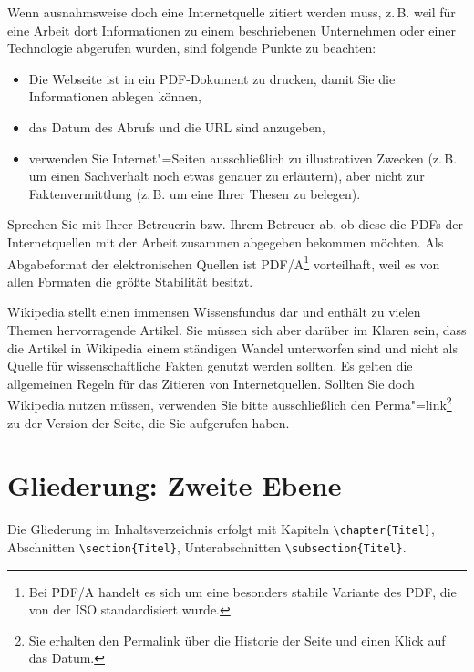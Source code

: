 Wenn ausnahmsweise doch eine Internetquelle zitiert werden muss, z.\,B. weil für eine Arbeit dort Informationen zu einem beschriebenen Unternehmen oder einer Technologie abgerufen wurden, sind folgende Punkte zu beachten:

\begin{itemize}
\item Die Webseite ist in ein PDF-Dokument zu drucken, damit Sie die Informationen ablegen können,
\item das Datum des Abrufs und die URL sind anzugeben,
\item verwenden Sie Internet"=Seiten ausschließlich zu illustrativen Zwecken (z.\,B. um einen Sachverhalt noch etwas genauer zu erläutern), aber nicht zur Faktenvermittlung (z.\,B. um eine Ihrer Thesen zu belegen).
\end{itemize}

Sprechen Sie mit Ihrer Betreuerin bzw. Ihrem Betreuer ab, ob diese die PDFs der Internetquellen mit der Arbeit zusammen abgegeben bekommen möchten. Als Abgabeformat der elektronischen Quellen ist PDF/A\footnote{Bei PDF/A handelt es sich um eine besonders stabile Variante des \ac{PDF}, die von der  \ac{ISO} standardisiert wurde.} vorteilhaft, weil es von allen Formaten die größte Stabilität besitzt.

Wikipedia stellt einen immensen Wissensfundus dar und enthält zu vielen Themen hervorragende Artikel. Sie müssen sich aber darüber im Klaren sein, dass die Artikel in Wikipedia einem ständigen Wandel unterworfen sind und nicht als Quelle für wissenschaftliche Fakten genutzt werden sollten. Es gelten die allgemeinen Regeln für das Zitieren von Internetquellen. Sollten Sie doch Wikipedia nutzen müssen, verwenden Sie bitte ausschließlich den Perma"=link\footnote{Sie erhalten den Permalink über die Historie der Seite und einen Klick auf das Datum.} zu der Version der Seite, die Sie aufgerufen haben.


\section{Gliederung: Zweite Ebene}

Die Gliederung im Inhaltsverzeichnis erfolgt mit Kapiteln \verb+\chapter{Titel}+, Abschnitten \verb+\section{Titel}+, Unterabschnitten \verb+\subsection{Titel}+.

